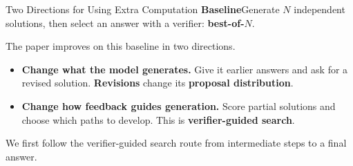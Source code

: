 \documentclass[aspectratio=1610,xcolor=dvipsnames,t]{beamer}
\newcommand{\keyterm}[1]{\textcolor{unirot}{\textbf{#1}}}
\begin{document}
\begin{frame}{Two Directions for Using Extra Computation}
  \textbf{Baseline}\quad Generate $N$ independent solutions, then select an answer with a verifier: \keyterm{best-of-$N$}.
  \par\medskip
  The paper improves on this baseline in two directions.
  \par\smallskip
  \begin{itemize}
    \item \textbf{Change what the model generates.} Give it earlier answers and ask for a revised solution. \keyterm{Revisions} change its \textbf{proposal distribution}.
    \par\smallskip
    \item \textbf{Change how feedback guides generation.} Score partial solutions and choose which paths to develop. This is \keyterm{verifier-guided search}.
  \end{itemize}
  \par\medskip
  We first follow the verifier-guided search route from intermediate steps to a final answer.
\end{frame}
\end{document}

